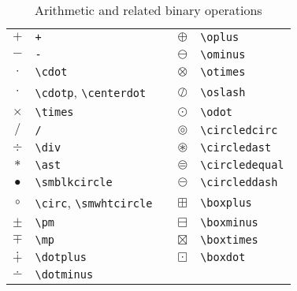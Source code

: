 \documentclass[captions=tableheading]{scrartcl}
\begin{document}
\begin{table}
  \caption{Arithmetic and related binary operations}
  \label{tab:arithmetic-and-related}
  \centering
  \begin{tabular}[c]{clp{1pt}cl}
    \toprule
    $+$ & \verb|+| & & $\oplus$ & \verb|\oplus| \\
    $-$ & \verb|-| & & $\ominus$ & \verb|\ominus| \\
    $\cdot$ & \verb|\cdot| & & $\otimes$ & \verb|\otimes| \\
    $\cdotp$ & \verb|\cdotp|, \verb|\centerdot| & &
    $\oslash$ & \verb|\oslash| \\
    \addlinespace
    $\times$ & \verb|\times| & & $\odot$ & \verb|\odot| \\
    $/$ & \verb|/| & & $\circledcirc$ & \verb|\circledcirc| \\
    $\div$ & \verb|\div| & & $\circledast$ & \verb|\circledast| \\
    $\ast$ & \verb|\ast| & & $\circledequal$ & \verb|\circledequal| \\
    \addlinespace
    $\smblkcircle$ & \verb|\smblkcircle| & &
    $\circleddash$ & \verb|\circleddash| \\
    $\circ$ & \verb|\circ|, \verb|\smwhtcircle| & &
    $\boxplus$ & \verb|\boxplus| \\
    $\pm$ & \verb|\pm| & & $\boxminus$ & \verb|\boxminus| \\
    $\mp$ & \verb|\mp| & & $\boxtimes$ & \verb|\boxtimes| \\
    \addlinespace
    $\dotplus$ & \verb|\dotplus| & & $\boxdot$ & \verb|\boxdot| \\
    $\dotminus$ & \verb|\dotminus| & & & \\
    \bottomrule
  \end{tabular}
\end{table}
\end{document}
